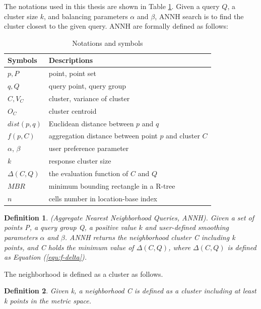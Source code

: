 \documentclass[a4paper,11pt]{report}
\theoremstyle{mytheoremstyle}
\newtheorem{definition}{Definition}
\begin{document}
The notations used in this thesis are shown in Table \ref{tab:var}. Given a query $Q$, a cluster size $k$, and balancing parameters $\alpha$ and $\beta$, ANNH search is to find the cluster closest to the given query. ANNH are formally defined as follows:

\begin{table}
  \begin{center}
  \caption{Notations and symbols}
    \begin{tabular}{|l|l|} \hline
      Symbols & Descriptions \\ \hline \hline
      $p, P$ & point, point set \\ \hline
      $q, Q$ & query point, query group \\ \hline
      $C, V_C$ & cluster, variance of cluster \\ \hline
      $O_C$ & cluster centroid \\ \hline
      $dist(p,q)$ & Euclidean distance between $p$ and $q$ \\ \hline
      $f(p, C)$  & aggregation distance between point $p$ and cluster $C$ \\ \hline
      $\alpha$, $\beta$ & user preference parameter \\ \hline
      $k$ & response cluster size \\ \hline
      $\Delta(C,Q)$ & the evaluation function of $C$ and $Q$ \\ \hline
      $MBR$ & minimum bounding rectangle in a R-tree \\ \hline
      $n$ & cells number in location-base index \\ \hline
    \end{tabular}
    \label{tab:var}
  \end{center}
\end{table}

\begin{definition}
(Aggregate Nearest Neighborhood Queries, ANNH). Given a set of points P, a query group Q, a positive value $k$ and user-defined smoothing parameters $\alpha$ and $\beta$. ANNH returns the neighborhood cluster C including k points, and C holds the minimum value of $\Delta(C, Q)$, where $\Delta(C, Q)$ is defined as Equation (\ref{equ:f-delta}).
\end{definition}

The neighborhood is defined as a cluster as follows.

\begin{definition}
Given k, a neighborhood C is defined as a cluster including at least k points in the metric space.
\end{definition}
\end{document}
